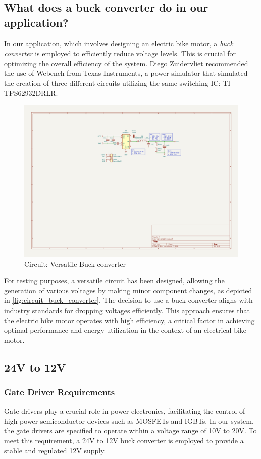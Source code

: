 \subsection{What does a buck converter do in our application?}
In our application, which involves designing an electric bike motor, a \textit{buck converter} is employed to efficiently reduce voltage levels. This is crucial for optimizing the overall efficiency of the system. Diego Zuidervliet\cite{zuidervliet2024} recommended the use of Webench from Texas Instruments, a power simulator that simulated the creation of three different circuits utilizing the same switching IC: TI TPS62932DRLR.
\begin{figure}[H]
    \centering
    \includegraphics[trim=1150 1500 900 350,clip,width=0.8\linewidth]{img//buckconverters/circuit.png}
    \caption{Circuit: Versatile Buck converter}
    \label{fig:circuit_buck_converter}
\end{figure}
For testing purposes, a versatile circuit has been designed, allowing the generation of various voltages by making minor component changes, as depicted in \autoref{fig:circuit_buck_converter}. The decision to use a buck converter aligns with industry standards for dropping voltages efficiently. This approach ensures that the electric bike motor operates with high efficiency, a critical factor in achieving optimal performance and energy utilization in the context of an electrical bike motor.

\subsection{24V to 12V}
\subsubsection{Gate Driver Requirements}
Gate drivers play a crucial role in power electronics, facilitating the control of high-power semiconductor devices such as MOSFETs and IGBTs. In our system, the gate drivers are specified to operate within a voltage range of 10V to 20V. To meet this requirement, a 24V to 12V buck converter is employed to provide a stable and regulated 12V supply.

